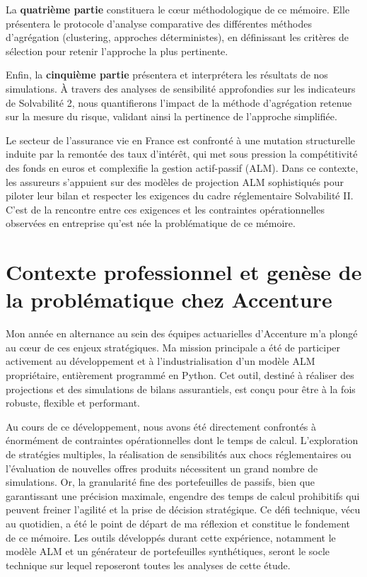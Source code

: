 La \textbf{quatrième partie} constituera le cœur méthodologique de ce mémoire. Elle présentera le protocole d'analyse comparative des différentes méthodes d'agrégation (clustering, approches déterministes), en définissant les critères de sélection pour retenir l'approche la plus pertinente.

Enfin, la \textbf{cinquième partie} présentera et interprétera les résultats de nos simulations. À travers des analyses de sensibilité approfondies sur les indicateurs de Solvabilité 2, nous quantifierons l'impact de la méthode d'agrégation retenue sur la mesure du risque, validant ainsi la pertinence de l'approche simplifiée.


Le secteur de l'assurance vie en France est confronté à une mutation structurelle induite par la remontée des taux d'intérêt, qui met sous pression la compétitivité des fonds en euros et complexifie la gestion actif-passif (ALM). Dans ce contexte, les assureurs s'appuient sur des modèles de projection ALM sophistiqués pour piloter leur bilan et respecter les exigences du cadre réglementaire Solvabilité II. C'est de la rencontre entre ces exigences et les contraintes opérationnelles observées en entreprise qu'est née la problématique de ce mémoire.

\section{Contexte professionnel et genèse de la problématique chez Accenture}

Mon année en alternance au sein des équipes actuarielles d'Accenture m'a plongé au cœur de ces enjeux stratégiques. Ma mission principale a été de participer activement au développement et à l'industrialisation d'un modèle ALM propriétaire, entièrement programmé en Python. Cet outil, destiné à réaliser des projections et des simulations de bilans assurantiels, est conçu pour être à la fois robuste, flexible et performant.

Au cours de ce développement, nous avons été directement confrontés à énormément de contraintes opérationnelles dont le temps de calcul. L'exploration de stratégies multiples, la réalisation de sensibilités aux chocs réglementaires ou l'évaluation de nouvelles offres produits nécessitent un grand nombre de simulations. Or, la granularité fine des portefeuilles de passifs, bien que garantissant une précision maximale, engendre des temps de calcul prohibitifs qui peuvent freiner l'agilité et la prise de décision stratégique. Ce défi technique, vécu au quotidien, a été le point de départ de ma réflexion et constitue le fondement de ce mémoire. Les outils développés durant cette expérience, notamment le modèle ALM et un générateur de portefeuilles synthétiques, seront le socle technique sur lequel reposeront toutes les analyses de cette étude.

